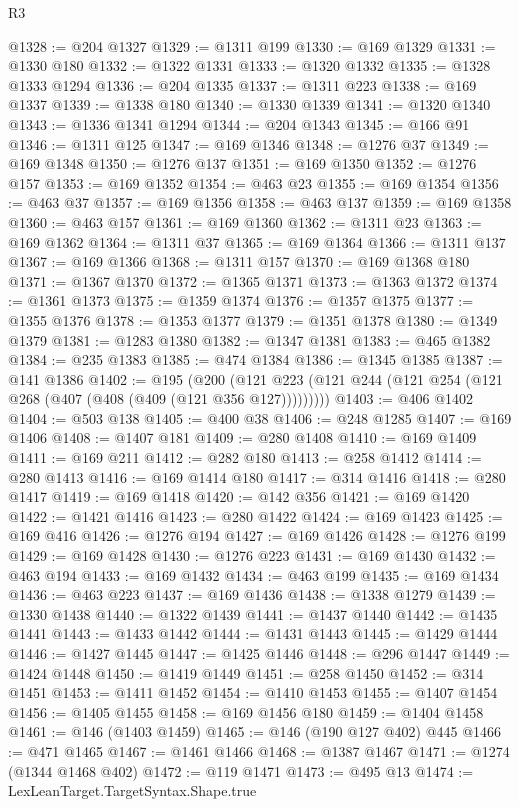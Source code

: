 \begin{lexlean}{R3}
\begin{coremodule}
@1328 := @204 @1327
@1329 := @1311 @199
@1330 := @169 @1329
@1331 := @1330 @180
@1332 := @1322 @1331
@1333 := @1320 @1332
@1335 := @1328 @1333 @1294
@1336 := @204 @1335
@1337 := @1311 @223
@1338 := @169 @1337
@1339 := @1338 @180
@1340 := @1330 @1339
@1341 := @1320 @1340
@1343 := @1336 @1341 @1294
@1344 := @204 @1343
@1345 := @166 @91
@1346 := @1311 @125
@1347 := @169 @1346
@1348 := @1276 @37
@1349 := @169 @1348
@1350 := @1276 @137
@1351 := @169 @1350
@1352 := @1276 @157
@1353 := @169 @1352
@1354 := @463 @23
@1355 := @169 @1354
@1356 := @463 @37
@1357 := @169 @1356
@1358 := @463 @137
@1359 := @169 @1358
@1360 := @463 @157
@1361 := @169 @1360
@1362 := @1311 @23
@1363 := @169 @1362
@1364 := @1311 @37
@1365 := @169 @1364
@1366 := @1311 @137
@1367 := @169 @1366
@1368 := @1311 @157
@1370 := @169 @1368 @180
@1371 := @1367 @1370
@1372 := @1365 @1371
@1373 := @1363 @1372
@1374 := @1361 @1373
@1375 := @1359 @1374
@1376 := @1357 @1375
@1377 := @1355 @1376
@1378 := @1353 @1377
@1379 := @1351 @1378
@1380 := @1349 @1379
@1381 := @1283 @1380
@1382 := @1347 @1381
@1383 := @465 @1382
@1384 := @235 @1383
@1385 := @474 @1384
@1386 := @1345 @1385
@1387 := @141 @1386
@1402 := @195
    (@200 (@121 @223 (@121 @244 (@121 @254 (@121 @268 (@407 (@408 (@409 (@121 @356 @127)))))))))
@1403 := @406 @1402
@1404 := @503 @138
@1405 := @400 @38
@1406 := @248 @1285
@1407 := @169 @1406
@1408 := @1407 @181
@1409 := @280 @1408
@1410 := @169 @1409
@1411 := @169 @211
@1412 := @282 @180
@1413 := @258 @1412
@1414 := @280 @1413
@1416 := @169 @1414 @180
@1417 := @314 @1416
@1418 := @280 @1417
@1419 := @169 @1418
@1420 := @142 @356
@1421 := @169 @1420
@1422 := @1421 @1416
@1423 := @280 @1422
@1424 := @169 @1423
@1425 := @169 @416
@1426 := @1276 @194
@1427 := @169 @1426
@1428 := @1276 @199
@1429 := @169 @1428
@1430 := @1276 @223
@1431 := @169 @1430
@1432 := @463 @194
@1433 := @169 @1432
@1434 := @463 @199
@1435 := @169 @1434
@1436 := @463 @223
@1437 := @169 @1436
@1438 := @1338 @1279
@1439 := @1330 @1438
@1440 := @1322 @1439
@1441 := @1437 @1440
@1442 := @1435 @1441
@1443 := @1433 @1442
@1444 := @1431 @1443
@1445 := @1429 @1444
@1446 := @1427 @1445
@1447 := @1425 @1446
@1448 := @296 @1447
@1449 := @1424 @1448
@1450 := @1419 @1449
@1451 := @258 @1450
@1452 := @314 @1451
@1453 := @1411 @1452
@1454 := @1410 @1453
@1455 := @1407 @1454
@1456 := @1405 @1455
@1458 := @169 @1456 @180
@1459 := @1404 @1458
@1461 := @146 (@1403 @1459)
@1465 := @146 (@190 @127 @402) @445
@1466 := @471 @1465
@1467 := @1461 @1466
@1468 := @1387 @1467
@1471 := @1274 (@1344 @1468 @402)
@1472 := @119 @1471
@1473 := @495 @13
@1474 := LexLeanTarget.TargetSyntax.Shape.true

\end{coremodule}
\end{lexlean}
